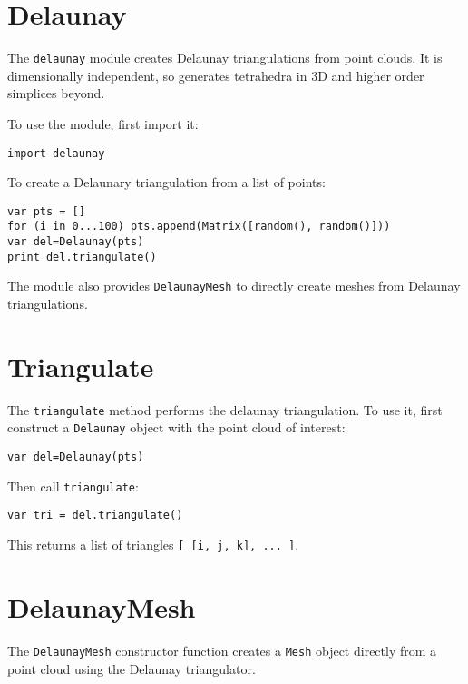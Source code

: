 \hypertarget{delaunay}{%
\section{Delaunay}\label{delaunay}}

The \texttt{delaunay} module creates Delaunay triangulations from point
clouds. It is dimensionally independent, so generates tetrahedra in 3D
and higher order simplices beyond.

To use the module, first import it:

\begin{lstlisting}
import delaunay
\end{lstlisting}

To create a Delaunary triangulation from a list of points:

\begin{lstlisting}
var pts = []
for (i in 0...100) pts.append(Matrix([random(), random()]))
var del=Delaunay(pts)
print del.triangulate()
\end{lstlisting}

The module also provides \texttt{DelaunayMesh} to directly create meshes
from Delaunay triangulations.

\hypertarget{triangulate}{%
\section{Triangulate}\label{triangulate}}

The \texttt{triangulate} method performs the delaunay triangulation. To
use it, first construct a \texttt{Delaunay} object with the point cloud
of interest:

\begin{lstlisting}
var del=Delaunay(pts)
\end{lstlisting}

Then call \texttt{triangulate}:

\begin{lstlisting}
var tri = del.triangulate()
\end{lstlisting}

This returns a list of triangles
\texttt{{[}\ {[}i,\ j,\ k{]},\ ...\ {]}}.

\hypertarget{delaunaymesh}{%
\section{DelaunayMesh}\label{delaunaymesh}}

The \texttt{DelaunayMesh} constructor function creates a \texttt{Mesh}
object directly from a point cloud using the Delaunay triangulator.

